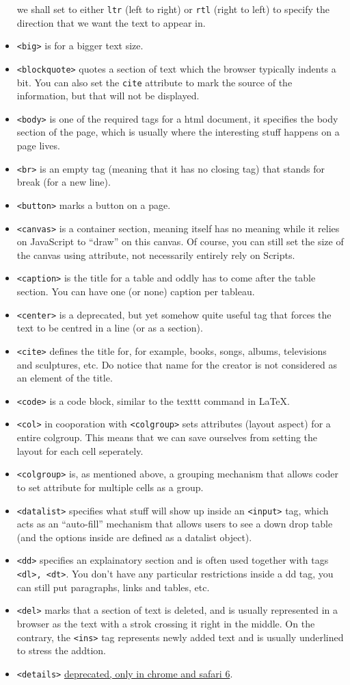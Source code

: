 \documentclass[oneside, 12pt]{article}
\newcommand{\itemm}[1]{\item \texttt{#1}}
\begin{document}
\begin{itemize}
	we shall set to either \texttt{ltr} (left to right) or \texttt{rtl} (right to left) to specify the
	direction that we want the text to appear in. 
	\itemm{<big>} is for a bigger text size.
	\itemm{<blockquote>} quotes a section of text which the browser typically indents a bit. You can
	also set the \texttt{cite} attribute to mark the source of the information, but that will not be
	displayed. 
	\itemm{<body>} is one of the required tags for a html document, it specifies the body section of
	the page, which is usually where the interesting stuff happens on a page lives.
	\itemm{<br>} is an empty tag (meaning that it has no closing tag) that stands for break (for a new line).
	\itemm{<button>} marks a button on a page.
	\itemm{<canvas>} is a container section, meaning itself has no meaning while it relies on JavaScript
	to ``draw'' on this canvas. Of course, you can still set the size of the canvas using attribute, 
	not necessarily entirely rely on Scripts.
	\itemm{<caption>} is the title for a table and oddly has to come after the table section. You can have
	one (or none) caption per tableau. 
	\itemm{<center>} is a deprecated, but yet somehow quite useful tag that forces the text to be
	centred in a line (or as a section). 
	\itemm{<cite>} defines the title for, for example, books, songs, albums, televisions and sculptures, etc.
	Do notice that name for the creator is not considered as an element of the title.
	\itemm{<code>} is a code block, similar to the texttt command in \LaTeX.
	\itemm{<col>} in cooporation with \texttt{<colgroup>} sets attributes (layout aspect) for a entire
	colgroup. This means that we can save ourselves from setting the layout for each cell seperately. 
	\itemm{<colgroup>} is, as mentioned above, a grouping mechanism that allows coder to set attribute
	for multiple cells as a group.
	\itemm{<datalist>} specifies what stuff will show up inside an \texttt{<input>} tag, which acts as
	an ``auto-fill'' mechanism that allows users to see a down drop table (and the options inside are
	defined as a datalist object).
	\itemm{<dd>} specifies an explainatory section and is often used together with tags \texttt{<dl>, <dt>}.
	You don't have any particular restrictions inside a dd tag, you can still put paragraphs, links and tables, etc.
	\itemm{<del>} marks that a section of text is deleted, and is usually represented in a browser as 
	the text with a strok crossing it right in the middle. On the contrary, the \texttt{<ins>} tag 
	represents newly added text and is usually underlined to stress the addtion.
	\itemm{<details>} \underline{deprecated, only in chrome and safari 6}.

\end{itemize}
\end{document}
